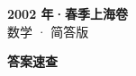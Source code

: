 \documentclass[zihao=-4, a4paper]{ctexart}
\begin{document}
\begin{center}
  {\Large\bfseries 2002 年·春季上海卷}\\[4pt]
  {\large 数学 · 简答版}
\end{center}
\medskip
{}

\clearpage
{}
\begin{center}{\Large\bfseries 答案速查}\end{center}
\medskip

\end{document}
